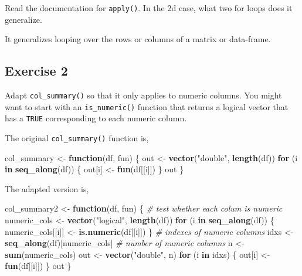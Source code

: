 \documentclass[]{book}
\newenvironment{Shaded}{\begin{snugshade}}{\end{snugshade}}
\newcommand{\CommentTok}[1]{\textcolor[rgb]{0.56,0.35,0.01}{\textit{#1}}}
\newcommand{\ControlFlowTok}[1]{\textcolor[rgb]{0.13,0.29,0.53}{\textbf{#1}}}
\newcommand{\KeywordTok}[1]{\textcolor[rgb]{0.13,0.29,0.53}{\textbf{#1}}}
\newcommand{\NormalTok}[1]{#1}
\newcommand{\StringTok}[1]{\textcolor[rgb]{0.31,0.60,0.02}{#1}}
\theoremstyle{definition}
\theoremstyle{definition}
\theoremstyle{definition}
\theoremstyle{remark}
\begin{document}
Read the documentation for \texttt{apply()}. In the 2d case, what two
for loops does it generalize.

It generalizes looping over the rows or columns of a matrix or
data-frame.

\hypertarget{exercise-2-53}{%
\subsection{Exercise 2}\label{exercise-2-53}}

Adapt \texttt{col\_summary()} so that it only applies to numeric
columns. You might want to start with an \texttt{is\_numeric()} function
that returns a logical vector that has a \texttt{TRUE} corresponding to
each numeric column.

The original \texttt{col\_summary()} function is,

\begin{Shaded}
\begin{Highlighting}[]
\NormalTok{col_summary <-}\StringTok{ }\ControlFlowTok{function}\NormalTok{(df, fun) \{}
\NormalTok{  out <-}\StringTok{ }\KeywordTok{vector}\NormalTok{(}\StringTok{"double"}\NormalTok{, }\KeywordTok{length}\NormalTok{(df))}
  \ControlFlowTok{for}\NormalTok{ (i }\ControlFlowTok{in} \KeywordTok{seq_along}\NormalTok{(df)) \{}
\NormalTok{    out[i] <-}\StringTok{ }\KeywordTok{fun}\NormalTok{(df[[i]])}
\NormalTok{  \}}
\NormalTok{  out}
\NormalTok{\}}
\end{Highlighting}
\end{Shaded}

The adapted version is,

\begin{Shaded}
\begin{Highlighting}[]
\NormalTok{col_summary2 <-}\StringTok{ }\ControlFlowTok{function}\NormalTok{(df, fun) \{}
  \CommentTok{# test whether each colum is numeric}
\NormalTok{  numeric_cols <-}\StringTok{ }\KeywordTok{vector}\NormalTok{(}\StringTok{"logical"}\NormalTok{, }\KeywordTok{length}\NormalTok{(df))}
  \ControlFlowTok{for}\NormalTok{ (i }\ControlFlowTok{in} \KeywordTok{seq_along}\NormalTok{(df)) \{}
\NormalTok{    numeric_cols[[i]] <-}\StringTok{ }\KeywordTok{is.numeric}\NormalTok{(df[[i]])}
\NormalTok{  \}}
  \CommentTok{# indexes of numeric columns}
\NormalTok{  idxs <-}\StringTok{ }\KeywordTok{seq_along}\NormalTok{(df)[numeric_cols]}
  \CommentTok{# number of numeric columns}
\NormalTok{  n <-}\StringTok{ }\KeywordTok{sum}\NormalTok{(numeric_cols)}
\NormalTok{  out <-}\StringTok{ }\KeywordTok{vector}\NormalTok{(}\StringTok{"double"}\NormalTok{, n)}
  \ControlFlowTok{for}\NormalTok{ (i }\ControlFlowTok{in}\NormalTok{ idxs) \{}
\NormalTok{    out[i] <-}\StringTok{ }\KeywordTok{fun}\NormalTok{(df[[i]])}
\NormalTok{  \}}
\NormalTok{  out}
\NormalTok{\}}
\end{Highlighting}
\end{Shaded}
\end{document}
